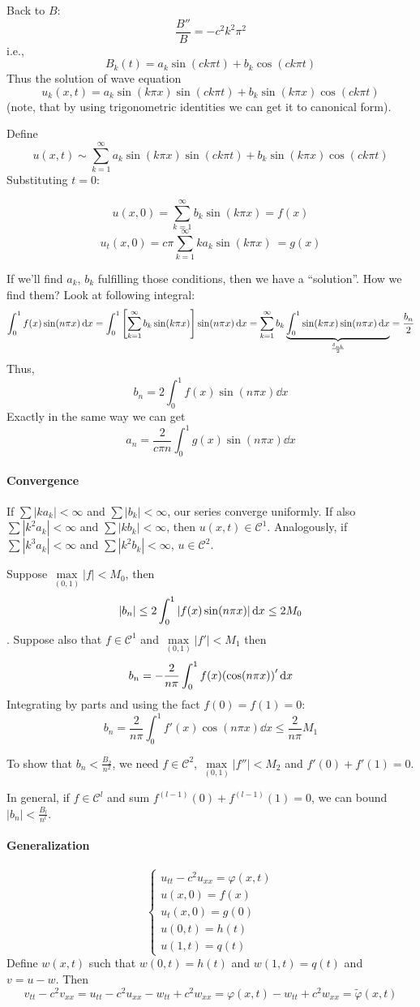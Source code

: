 Back to $B$:
$$\frac{B''}{B} = - c^2k^2\pi^2$$
i.e.,
$$B_k(t) = a_k\sin(ck\pi t)+b_k\cos(ck\pi t)$$
Thus the solution of wave equation
$$u_k(x,t) = a_k \sin(k\pi x)\sin(ck\pi t)+b_k \sin(k\pi x)\cos(ck\pi t)$$
(note, that by using trigonometric identities we can get it to canonical form).

Define 
$$u(x,t) \sim \sum_{k=1}^\infty  a_k \sin(k\pi x)\sin(ck\pi t)+b_k \sin(k\pi x)\cos(ck\pi t)$$
Substituting $t=0$:

$$u(x,0) = \sum_{k=1}^\infty b_k \sin(k\pi x) = f(x)$$
$$u_t(x,0) = c\pi \sum_{k=1}^\infty k a_k \sin(k\pi x)\ = g(x)$$

If we'll find $a_k$, $b_k$ fulfilling those conditions, then we have a ``solution''. How we find them? Look at following integral:
$$\int_0^1 f(x) \sin(n \pi x) \dd{x} = \int_0^1 \qty[\sum_{k=1}^\infty b_k \sin(k\pi x)]\sin(n \pi x) \dd{x} = \sum_{k=1}^\infty b_k\underbrace{ \int_0^1  \sin(k\pi x)\sin(n \pi x) \dd{x}}_{\frac{\delta_{nk}}{2}} = \frac{b_n}{2}$$
Thus,
$$b_n = 2\int_0^1 f(x) \sin(n \pi x) \dd{x}$$
Exactly in the same way we can get
$$a_n = \frac{2}{c\pi n} \int_0^1 g(x) \sin(n \pi x) \dd{x}$$
\paragraph{Convergence}
If $\sum |ka_k| < \infty$ and $\sum |b_k| < \infty$, our series converge uniformly. If also $\sum |k^2a_k| < \infty$ and $\sum |kb_k| < \infty$, then $u(x,t) \in \mathcal{C}^1$. Analogously, if $\sum |k^3a_k| < \infty$ and $\sum |k^2b_k| < \infty$, $u\in \mathcal{C}^2$.

Suppose $\max\limits_{(0,1)} |f|<M_0$, then 
$$|b_n| \leq 2 \int_0^1 \abs{f(x) \sin (n\pi x)}\dd{x} \leq 2M_0$$. 
Suppose also that $f\in \mathcal{C}^1$ and  $\max\limits_{(0,1)} |f'|<M_1$ then
$$b_n = -\frac{2}{n\pi} \int_0^1 f(x) \qty(\cos(n \pi x))'\dd{x}$$
Integrating by parts and using the fact $f(0)=f(1)=0$:
 $$b_n = \frac{2}{n \pi} \int_0^1 f'(x) \cos(n \pi x) \dd{x} \leq \frac{2}{n\pi}M_1$$
 
 To show that $b_n<\frac{B_2}{n^2}$, we need $f\in \mathcal{C}^2$,  $\max\limits_{(0,1)} |f''|<M_2$ and $f'(0)+f'(1)=0$. %

In general, if $f\in \mathcal{C}^l$ and sum $f^{(l-1)}(0) + f^{(l-1)}(1) = 0$, we can bound $|b_n| < \frac{B_l}{n^l}$.

\paragraph{Generalization}
$$\begin{cases}
u_{tt} - c^2 u_{xx} = \varphi(x,t)\\
u(x,0)=f(x)\\
u_t(x,0) = g(0)\\
u(0,t) = h(t)\\
u(1,t)= q(t)
\end{cases}$$
Define $w(x,t)$ such that $w(0,t) = h(t)$ and $w(1,t)=q(t)$ and $v=u-w$. Then
$$v_{tt}-c^2v_{xx} = u_{tt} - c^2 u_{xx} - w_{tt} + c^2w_{xx} = \varphi(x,t)- w_{tt} + c^2w_{xx}  = \tilde{\varphi}(x,t)$$


